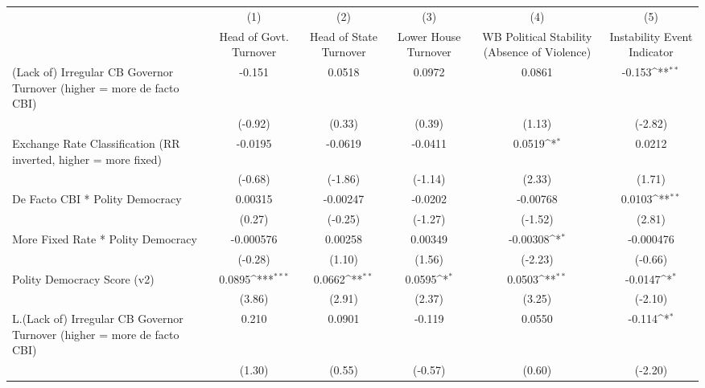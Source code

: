 {
\def\sym#1{\ifmmode^{#1}\else\(^{#1}\)\fi}
\begin{longtable}{l*{5}{c}}
\hline\hline\endfirsthead\hline\endhead\hline\endfoot\endlastfoot
                &\multicolumn{1}{c}{(1)}&\multicolumn{1}{c}{(2)}&\multicolumn{1}{c}{(3)}&\multicolumn{1}{c}{(4)}&\multicolumn{1}{c}{(5)}\\
                &\multicolumn{1}{c}{Head of Govt. Turnover}&\multicolumn{1}{c}{Head of State Turnover}&\multicolumn{1}{c}{Lower House Turnover}&\multicolumn{1}{c}{WB Political Stability (Absence of Violence)}&\multicolumn{1}{c}{Instability Event Indicator}\\
\hline
(Lack of) Irregular CB Governor Turnover (higher = more de facto CBI)&   -0.151         &   0.0518         &   0.0972         &   0.0861         &   -0.153\sym{**} \\
                &  (-0.92)         &   (0.33)         &   (0.39)         &   (1.13)         &  (-2.82)         \\
[1em]
Exchange Rate Classification (RR inverted, higher = more fixed)&  -0.0195         &  -0.0619         &  -0.0411         &   0.0519\sym{*}  &   0.0212         \\
                &  (-0.68)         &  (-1.86)         &  (-1.14)         &   (2.33)         &   (1.71)         \\
[1em]
De Facto CBI * Polity Democracy&  0.00315         & -0.00247         &  -0.0202         & -0.00768         &   0.0103\sym{**} \\
                &   (0.27)         &  (-0.25)         &  (-1.27)         &  (-1.52)         &   (2.81)         \\
[1em]
More Fixed Rate * Polity Democracy&-0.000576         &  0.00258         &  0.00349         & -0.00308\sym{*}  &-0.000476         \\
                &  (-0.28)         &   (1.10)         &   (1.56)         &  (-2.23)         &  (-0.66)         \\
[1em]
Polity Democracy Score (v2)&   0.0895\sym{***}&   0.0662\sym{**} &   0.0595\sym{*}  &   0.0503\sym{**} &  -0.0147\sym{*}  \\
                &   (3.86)         &   (2.91)         &   (2.37)         &   (3.25)         &  (-2.10)         \\
[1em]
L.(Lack of) Irregular CB Governor Turnover (higher = more de facto CBI)&    0.210         &   0.0901         &   -0.119         &   0.0550         &   -0.114\sym{*}  \\
                &   (1.30)         &   (0.55)         &  (-0.57)         &   (0.60)         &  (-2.20)         \\

\end{longtable}}
